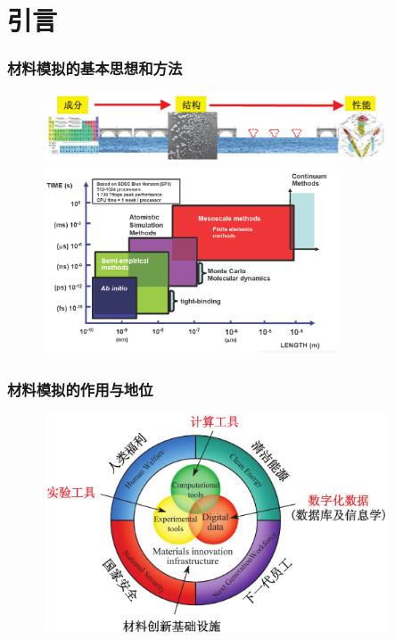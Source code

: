 \documentclass[cjk,slidestop,compress,mathserif,blue]{beamer}
\begin{document}
\small
\section{引言}
\frame
{
	\frametitle{材料模拟的基本思想和方法}
\begin{figure}[h!]
\vspace*{-0.25in}
\centering
\includegraphics[height=0.80in,width=4.05in]{Figures/MGE-2.png}
\vskip 0.05pt
\includegraphics[height=2.20in,width=3.45in]{Figures/Multi-Scale-6.png}
\label{Multi-Scale}
\end{figure}
}

\frame
{
	\frametitle{材料模拟的作用与地位}
\begin{figure}[h!]
\vspace*{-0.18in}
\centering
\includegraphics[height=2.55in,width=4.05in]{Figures/MGE.png}
\label{MGE}
\end{figure}
}
\end{document}
